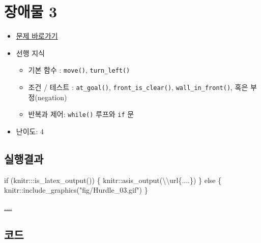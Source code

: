 \documentclass[
  b5paperpaper,
  DIV=11,
  numbers=noendperiod]{scrreprt}
\newenvironment{Shaded}{\begin{snugshade}}{\end{snugshade}}
\newcommand{\ControlFlowTok}[1]{\textcolor[rgb]{0.00,0.23,0.31}{#1}}
\newcommand{\FunctionTok}[1]{\textcolor[rgb]{0.28,0.35,0.67}{#1}}
\newcommand{\NormalTok}[1]{\textcolor[rgb]{0.00,0.23,0.31}{#1}}
\newcommand{\SpecialCharTok}[1]{\textcolor[rgb]{0.37,0.37,0.37}{#1}}
\newcommand{\StringTok}[1]{\textcolor[rgb]{0.13,0.47,0.30}{#1}}
\providecommand{\tightlist}{%
  \setlength{\itemsep}{0pt}\setlength{\parskip}{0pt}}\usepackage{longtable,booktabs,array}
\begin{document}
\hypertarget{hurdle-03}{%
\section{장애물 3}\label{hurdle-03}}

\begin{itemize}
\tightlist
\item
  \href{https://reeborg.ca/reeborg.html?lang=ko-en\&mode=python\&menu=worlds\%2Fmenus\%2Freeborg_intro_en.json\&name=Hurdle\%203\&url=worlds\%2Ftutorial_en\%2Fhurdle3.json}{문제
  바로가기}
\item
  선행 지식

  \begin{itemize}
  \tightlist
  \item
    기본 함수 : \texttt{move()}, \texttt{turn\_left()}
  \item
    조건 / 테스트 : \texttt{at\_goal()}, \texttt{front\_is\_clear()},
    \texttt{wall\_in\_front()}, 혹은 부정(negation)
  \item
    반복과 제어: \texttt{while()} 루프와 \texttt{if} 문
  \end{itemize}
\item
  난이도: 4
\end{itemize}

\hypertarget{uxc2e4uxd589uxacb0uxacfc-13}{%
\subsection{실행결과}\label{uxc2e4uxd589uxacb0uxacfc-13}}

\begin{Shaded}
\begin{Highlighting}[]
\ControlFlowTok{if}\NormalTok{ (knitr}\SpecialCharTok{:::}\FunctionTok{is\_latex\_output}\NormalTok{()) \{}
\NormalTok{  knitr}\SpecialCharTok{::}\FunctionTok{asis\_output}\NormalTok{(}\StringTok{\textquotesingle{}}\SpecialCharTok{\textbackslash{}\textbackslash{}}\StringTok{url\{....\}\textquotesingle{}}\NormalTok{)}
\NormalTok{\} }\ControlFlowTok{else}\NormalTok{ \{}
\NormalTok{  knitr}\SpecialCharTok{::}\FunctionTok{include\_graphics}\NormalTok{(}\StringTok{"fig/Hurdle\_03.gif"}\NormalTok{)}
\NormalTok{\}}
\end{Highlighting}
\end{Shaded}

\url{....}

\hypertarget{uxcf54uxb4dc-13}{%
\subsection{코드}\label{uxcf54uxb4dc-13}}
\end{document}
